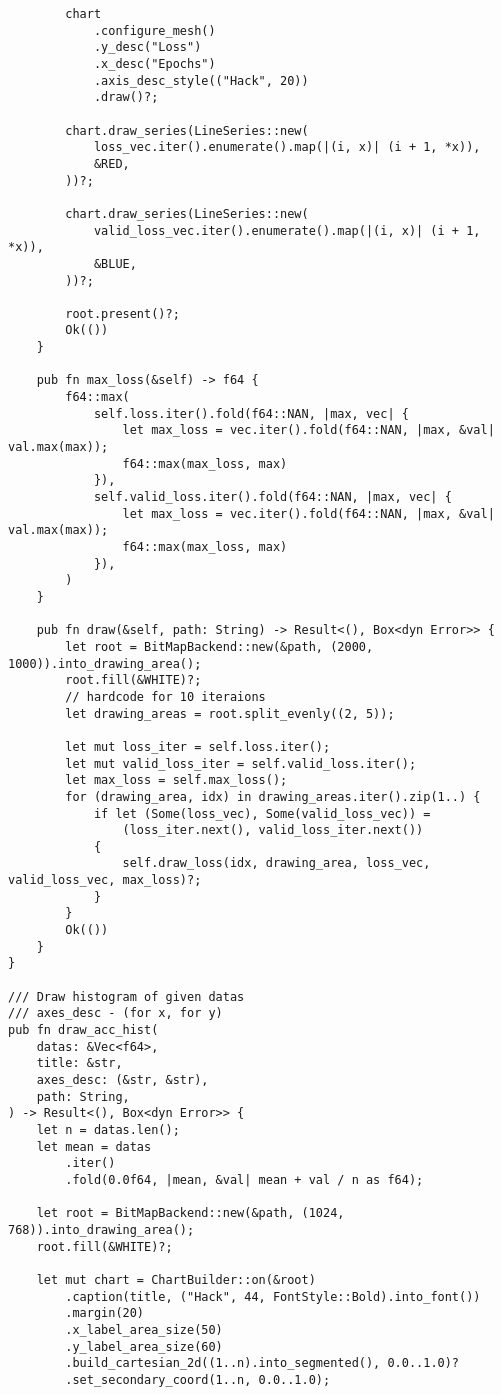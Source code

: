 \begin{code}
\begin{verbatim}
        chart
            .configure_mesh()
            .y_desc("Loss")
            .x_desc("Epochs")
            .axis_desc_style(("Hack", 20))
            .draw()?;

        chart.draw_series(LineSeries::new(
            loss_vec.iter().enumerate().map(|(i, x)| (i + 1, *x)),
            &RED,
        ))?;

        chart.draw_series(LineSeries::new(
            valid_loss_vec.iter().enumerate().map(|(i, x)| (i + 1, *x)),
            &BLUE,
        ))?;

        root.present()?;
        Ok(())
    }

    pub fn max_loss(&self) -> f64 {
        f64::max(
            self.loss.iter().fold(f64::NAN, |max, vec| {
                let max_loss = vec.iter().fold(f64::NAN, |max, &val| val.max(max));
                f64::max(max_loss, max)
            }),
            self.valid_loss.iter().fold(f64::NAN, |max, vec| {
                let max_loss = vec.iter().fold(f64::NAN, |max, &val| val.max(max));
                f64::max(max_loss, max)
            }),
        )
    }

    pub fn draw(&self, path: String) -> Result<(), Box<dyn Error>> {
        let root = BitMapBackend::new(&path, (2000, 1000)).into_drawing_area();
        root.fill(&WHITE)?;
        // hardcode for 10 iteraions
        let drawing_areas = root.split_evenly((2, 5));

        let mut loss_iter = self.loss.iter();
        let mut valid_loss_iter = self.valid_loss.iter();
        let max_loss = self.max_loss();
        for (drawing_area, idx) in drawing_areas.iter().zip(1..) {
            if let (Some(loss_vec), Some(valid_loss_vec)) =
                (loss_iter.next(), valid_loss_iter.next())
            {
                self.draw_loss(idx, drawing_area, loss_vec, valid_loss_vec, max_loss)?;
            }
        }
        Ok(())
    }
}

/// Draw histogram of given datas
/// axes_desc - (for x, for y)
pub fn draw_acc_hist(
    datas: &Vec<f64>,
    title: &str,
    axes_desc: (&str, &str),
    path: String,
) -> Result<(), Box<dyn Error>> {
    let n = datas.len();
    let mean = datas
        .iter()
        .fold(0.0f64, |mean, &val| mean + val / n as f64);

    let root = BitMapBackend::new(&path, (1024, 768)).into_drawing_area();
    root.fill(&WHITE)?;

    let mut chart = ChartBuilder::on(&root)
        .caption(title, ("Hack", 44, FontStyle::Bold).into_font())
        .margin(20)
        .x_label_area_size(50)
        .y_label_area_size(60)
        .build_cartesian_2d((1..n).into_segmented(), 0.0..1.0)?
        .set_secondary_coord(1..n, 0.0..1.0);


\end{verbatim}
\end{code}
